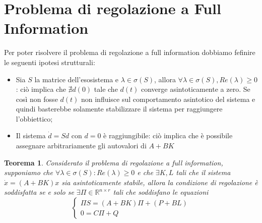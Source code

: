 \documentclass{article}
\newtheorem{theorem}{\textbf{Teorema}}
\theoremstyle{definition}
\begin{document}
\section*{Problema di regolazione a Full Information}
Per poter risolvere il problema di regolazione a full information dobbiamo fefinire le seguenti ipotesi strutturali:\begin{itemize}
    \item Sia \(S\) la matrice dell'esosistema e \(\lambda\in\sigma{(S)}\), allora \(\forall\lambda\in\sigma{(S)},Re(\lambda)\geq 0\): ciò implica che \(\nexists d(0) \) tale che \(d(t)\) converge asintoticamente a zero. Se così non fosse \(d(t)\) non influisce sul comportamento asintotico del sistema e quindi basterebbe solamente stabilizzare il sistema per raggiungere l'obbiettico;
    \item Il sistema \(\dot{d}=Sd\) con \(d=0\) è raggiungibile: ciò implica che è possibile assegnare arbitrariamente gli autovalori di \(A+BK\)
\end{itemize}
\begin{theorem}
    Considerato il problema di regolazione a full information, supponiamo che \(\forall\lambda\in\sigma{(S)}:Re(\lambda)\geq 0\) e che \(\exists K,L\) tali che il sistema \(\dot{x}=(A+BK)x\) sia asintoticamente stabile, allora la condizione di regolazione è soddisfatta se e solo se \(\exists \Pi\in\mathbb{R}^{n\times r}\) tali che soddisfano le equazioni\begin{equation*}
        \begin{cases}
            \Pi S=(A+BK)\Pi+(P+BL)\\
            0=C\Pi+Q
        \end{cases}
    \end{equation*}
\end{theorem}
\end{document}
